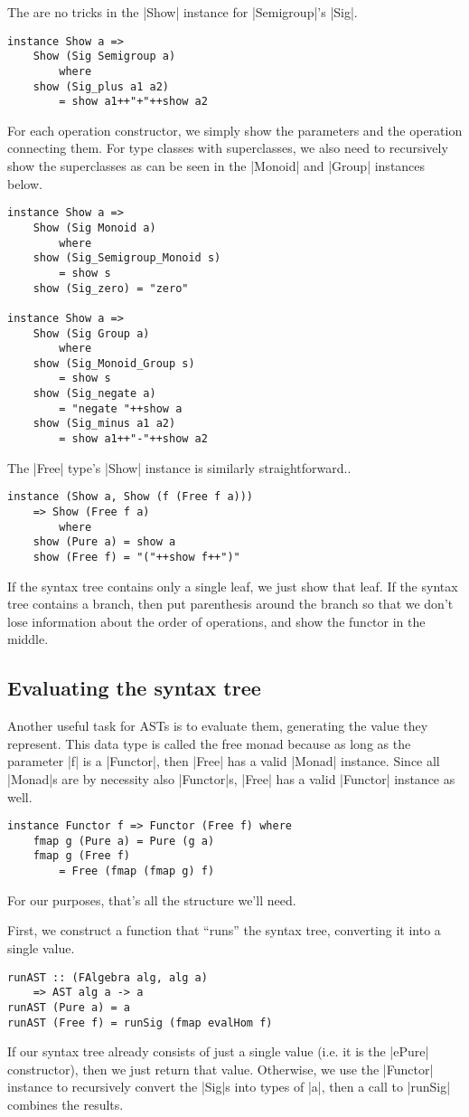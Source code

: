 \documentclass[preprint]{sigplanconf}
\theoremstyle{definition}
\begin{document}
The are no tricks in the |Show| instance for |Semigroup|'s |Sig|.
\begin{lstlisting}
instance Show a =>
    Show (Sig Semigroup a)
        where
    show (Sig_plus a1 a2)
        = show a1++"+"++show a2
\end{lstlisting}
For each operation constructor, we simply show the parameters and the operation connecting them.
For type classes with superclasses, we also need to recursively show the superclasses as can be seen in the |Monoid| and |Group| instances below.
\begin{lstlisting}
instance Show a =>
    Show (Sig Monoid a)
        where
    show (Sig_Semigroup_Monoid s)
        = show s
    show (Sig_zero) = "zero"

instance Show a =>
    Show (Sig Group a)
        where
    show (Sig_Monoid_Group s)
        = show s
    show (Sig_negate a)
        = "negate "++show a
    show (Sig_minus a1 a2)
        = show a1++"-"++show a2
\end{lstlisting}
The |Free| type's |Show| instance is similarly straightforward..
\begin{lstlisting}
instance (Show a, Show (f (Free f a)))
    => Show (Free f a)
        where
    show (Pure a) = show a
    show (Free f) = "("++show f++")"
\end{lstlisting}
If the syntax tree contains only a single leaf, we just show that leaf.
If the syntax tree contains a branch,
then put parenthesis around the branch so that we don't lose information about the order of operations, and show the functor in the middle.

\subsection{Evaluating the syntax tree}
Another useful task for ASTs is to evaluate them,
generating the value they represent.
This data type is called the free monad because as long as the parameter |f| is a |Functor|,
then |Free| has a valid |Monad| instance.
Since all |Monad|s are by necessity also |Functor|s,
|Free| has a valid |Functor| instance as well.
\begin{lstlisting}
instance Functor f => Functor (Free f) where
    fmap g (Pure a) = Pure (g a)
    fmap g (Free f)
        = Free (fmap (fmap g) f)
\end{lstlisting}
For our purposes, that's all the structure we'll need.

First, we construct a function that ``runs'' the syntax tree, converting it into a single value.
\begin{lstlisting}
runAST :: (FAlgebra alg, alg a)
    => AST alg a -> a
runAST (Pure a) = a
runAST (Free f) = runSig (fmap evalHom f)
\end{lstlisting}
If our syntax tree already consists of just a single value (i.e. it is the |ePure| constructor),
then we just return that value.
Otherwise, we use the |Functor| instance to recursively convert the |Sig|s into types of |a|, then a call to |runSig| combines the results.
\end{document}

